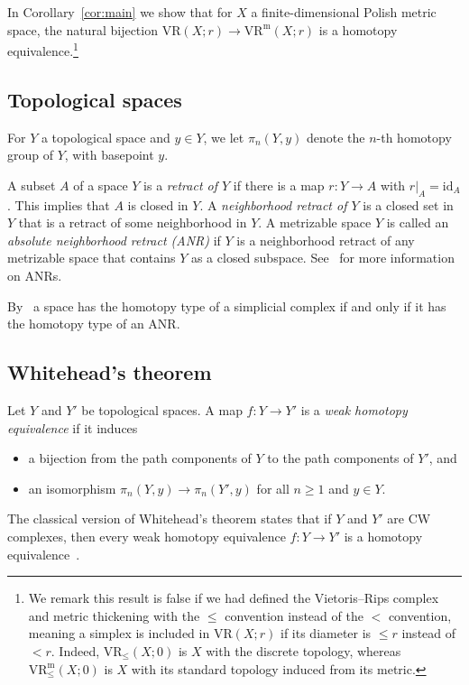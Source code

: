 \documentclass[11pt, reqno, english]{amsart}
\theoremstyle{plain}
\theoremstyle{definition}
\theoremstyle{myremark}
\newcommand{\id}{\mathrm{id}}
\newcommand{\vr}[2]{\mathrm{VR}(#1;#2)}
\newcommand{\vrleq}[2]{\mathrm{VR}_\le(#1;#2)}
\newcommand{\vrm}[2]{\mathrm{VR}^\mathrm{m}(#1;#2)}
\newcommand{\vrmleq}[2]{\mathrm{VR}^\mathrm{m}_\le(#1;#2)}
\begin{document}
In Corollary~\ref{cor:main} we show that for $X$ a finite-dimensional Polish metric space, the natural bijection $\vr{X}{r}\to\vrm{X}{r}$ is a homotopy equivalence.\footnote{
We remark this result is false if we had defined the Vietoris--Rips complex and metric thickening with the $\le$ convention instead of the $<$ convention, meaning a simplex is included in $\vr{X}{r}$ if its diameter is $\le r$ instead of $<r$.
Indeed, $\vrleq{X}{0}$ is $X$ with the discrete topology, whereas $\vrmleq{X}{0}$ is $X$ with its standard topology induced from its metric.
}


\subsection{Topological spaces}

For $Y$ a topological space and $y\in Y$, we let $\pi_n(Y,y)$ denote the $n$-th homotopy group of $Y$, with basepoint $y$.

A subset $A$ of a space $Y$ is a \emph{retract of $Y$} if there is a map $r\colon Y\to A$ with $r|_A=\id_A$.
This implies that $A$ is closed in $Y$.
A \emph{neighborhood retract of $Y$} is a closed set in $Y$
that is a retract of some neighborhood in $Y$.
A metrizable space $Y$ is called an
\emph{absolute neighborhood retract (ANR)} if $Y$ is a
neighborhood retract of any metrizable space that contains $Y$ as a closed subspace.
See~\cite{sakai2013geometric} for more information on ANRs.

By~\cite[Corollary~6.6.5]{sakai2013geometric} a space has the homotopy type of a simplicial complex if and only if it has the homotopy type of an ANR.


\subsection{Whitehead's theorem}

Let $Y$ and $Y'$ be topological spaces.
A map $f\colon Y\to Y'$ is a \emph{weak homotopy equivalence} if it induces
\begin{itemize}
\item a bijection from the path components of $Y$ to the path components of $Y'$, and
\item an isomorphism $\pi_n(Y,y)\to\pi_n(Y',y)$ for all $n\ge 1$ and $y\in Y$.
\end{itemize}

The classical version of Whitehead's theorem states that if $Y$ and $Y'$ are CW complexes, then every weak homotopy equivalence $f\colon Y\to Y'$ is a homotopy equivalence~\cite{Hatcher}.
\end{document}
